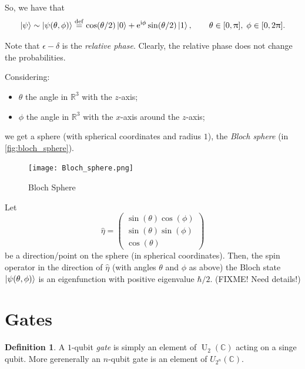 \documentclass[12pt]{amsart}
\theoremstyle{plain}
\theoremstyle{definition}
\newtheorem{definition}[theorem]{Definition}
\theoremstyle{remarks}
\newcommand{\R}{\mathbb{R}}
\newcommand{\C}{\mathbb{C}}
\newcommand{\me}{\mathrm{e}}
\newcommand{\mi}{\mathrm{i}}
\newcommand{\mpi}{\uppi}
\newcommand{\idef}{\overset{{\rm def}}{=}}
\DeclareMathOperator{\U}{U}  %
\begin{document}
So, we have that
\begin{equation}\label{eq:bloch_coord}
  \ket{\psi} \sim \ket{\psi(\theta, \phi)} \idef \cos(\theta/2) \ket{0} + \me^{\mi \phi} \sin(\theta/2) \ket{1}, \qquad \theta \in [0, \mpi], \; \phi \in [0, 2 \mpi].
\end{equation}

Note that $\epsilon - \delta$ is the \emph{relative phase}.  Clearly, the relative phase does not change the probabilities.

Considering:
\begin{itemize}

\item $\theta$ the angle in $\R^3$ with the $z$-axis;

\item $\phi$ the angle in $\R^3$ with the $x$-axis around the $z$-axis;

\end{itemize}
we get a sphere (with spherical coordinates and radius $1$), the \emph{Bloch sphere} (in \vref{fig:bloch_sphere}).

\begin{figure}\centering

  \texttt{[image: Bloch\_sphere.png]}

  \caption{Bloch Sphere}\label{fig:bloch_sphere}
\end{figure}

Let
\[
  \hat{\eta} = \begin{pmatrix}
    \sin(\theta)\cos(\phi) \\
    \sin(\theta)\sin(\phi) \\
    \cos(\theta)
  \end{pmatrix}
\]
be a direction/point on the sphere (in spherical coordinates).  Then, the spin operator in the direction of $\hat{\eta}$ (with angles $\theta$ and $\phi$ as above) the Bloch state $\ket{\psi(\theta, \phi)}$ is an eigenfunction with positive eigenvalue $\hbar/2$.  (FIXME!  Need details!)


\section{Gates}

\begin{definition}
  A $1$-qubit \emph{gate} is simply an element of $\U_2(\C)$ acting on a singe qubit.  More gerenerally an $n$-qubit gate is an element of $U_{2^n}(\C)$.
\end{definition}
\end{document}
